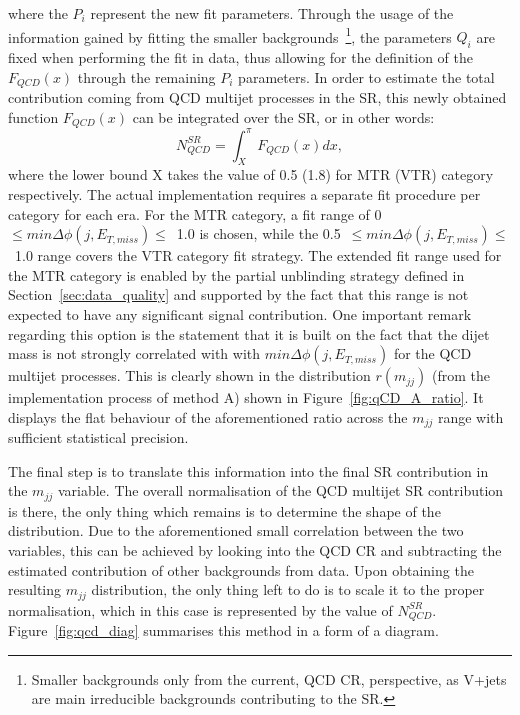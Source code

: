 where the $P_i$ represent the new fit parameters. Through the usage of the information gained by fitting the smaller backgrounds~\footnote{Smaller backgrounds only from the current, QCD CR, perspective, as V+jets are main irreducible backgrounds contributing to the SR.}, the parameters $Q_i$ are fixed when performing the fit in data, thus allowing for the definition of the $F_{QCD}(x)$ through the remaining $P_i$ parameters. In order to estimate the total contribution coming from QCD multijet processes in the SR, this newly obtained function $F_{QCD}(x)$ can be integrated over the SR, or in other words:
\begin{equation}
    N_{QCD}^{SR} = \int_X^{\pi}F_{QCD}(x)dx,
\end{equation}
where the lower bound X takes the value of 0.5 (1.8) for MTR (VTR) category respectively. The actual implementation requires a separate fit procedure per category for each era. For the MTR category, a fit range of 0~$\leq min\Delta\phi(j,E_{T,miss})\leq$~1.0 is chosen, while the 0.5~$\leq min\Delta\phi(j,E_{T,miss})\leq$~1.0 range covers the VTR category fit strategy. The extended fit range used for the MTR category is enabled by the partial unblinding strategy defined in Section~\ref{sec:data_quality} and supported by the fact that this range is not expected to have any significant signal contribution. One important remark regarding this option is the statement that it is built on the fact that the dijet mass is not strongly correlated with with $min\Delta\phi(j,E_{T,miss})$ for the QCD multijet processes. This is clearly shown in the distribution $r(m_{jj})$ (from the implementation process of method A) shown in Figure~\ref{fig:qCD_A_ratio}. It displays the flat behaviour of the aforementioned ratio across the $m_{jj}$ range with sufficient statistical precision.

\hspace{10pt} The final step is to translate this information into the final SR contribution in the $m_{jj}$ variable. The overall normalisation of the QCD multijet SR contribution is there, the only thing which remains is to determine the shape of the distribution. Due to the aforementioned small correlation between the two variables, this can be achieved by looking into the QCD CR and subtracting the estimated contribution of other backgrounds from data. Upon obtaining the resulting $m_{jj}$ distribution, the only thing left to do is to scale it to the proper normalisation, which in this case is represented by the value of $N_{QCD}^{SR}$. Figure~\ref{fig:qcd_diag} summarises this method in a form of a diagram.



